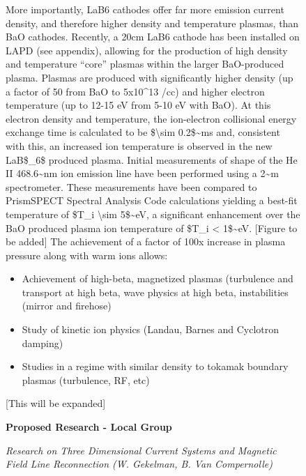\documentclass[11pt]{article}
\begin{document}
\begin{description}
\begin{figure}[!htbp]
More importantly, LaB6 cathodes offer far more emission current density,
and therefore higher density and temperature plasmas, than BaO cathodes.
Recently, a 20cm LaB6 cathode has been installed on LAPD (see appendix),
allowing for the production of high density and temperature ``core''
plasmas within the larger BaO-produced plasma. Plasmas are produced with
significantly higher density (up a factor of 50 from BaO to 5x10\^{}13
/cc) and higher electron temperature (up to 12-15 eV from 5-10 eV with
BaO). At this electron density and temperature, the ion-electron
collisional energy exchange time is calculated to be
\$\textbackslash{}sim 0.2\$\textasciitilde{}ms and, consistent with
this, an increased ion temperature is observed in the new LaB\$\_6\$
produced plasma. Initial measurements of shape of the He II
468.6\textasciitilde{}nm ion emission line have been performed using a
2\textasciitilde{}m spectrometer. These measurements have been compared
to PrismSPECT Spectral Analysis Code calculations yielding a best-fit
temperature of \$T\_i \textbackslash{}sim 5\$\textasciitilde{}eV, a
significant enhancement over the BaO produced plasma ion temperature of
\$T\_i \textless{} 1\$\textasciitilde{}eV. {[}Figure to be added{]} The
achievement of a factor of 100x increase in plasma pressure along with
warm ions allows:


\begin{itemize}
\item
  Achievement of high-beta, magnetized plasmas (turbulence and transport
  at high beta, wave physics at high beta, instabilities (mirror and
  firehose)
\item
  Study of kinetic ion physics (Landau, Barnes and Cyclotron damping)
\item
  Studies in a regime with similar density to tokamak boundary plasmas
  (turbulence, RF, etc)
\end{itemize}


{[}This will be expanded{]}

\textbf{Proposed Research - Local Group}


\emph{Research on Three Dimensional Current Systems and Magnetic Field
Line Reconnection (W. Gekelman, B. Van Compernolle)}


\end{figure}
\end{description}
\end{document}
